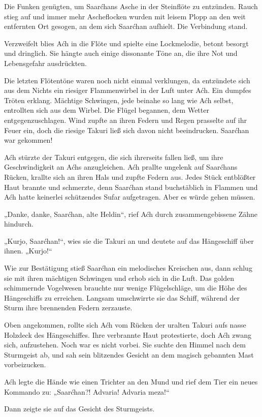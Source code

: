 Die Funken genügten, um Saarćhans Asche in der Steinflöte zu entzünden. Rauch stieg auf und immer mehr Ascheflocken wurden mit leisem Plopp an den weit entfernten Ort gesogen, an dem sich Saarćhan aufhielt. Die Verbindung stand.

Verzweifelt blies Aćh in die Flöte und spielte eine Lockmelodie, betont besorgt und dringlich. Sie hängte auch einige dissonante Töne an, die ihre Not und Lebensgefahr ausdrückten.

Die letzten Flötentöne waren noch nicht einmal verklungen, da entzündete sich aus dem Nichts ein riesiger Flammenwirbel in der Luft unter Aćh. Ein dumpfes Tröten erklang. Mächtige Schwingen, jede beinahe so lang wie Aćh selbst, entrollten sich aus dem Wirbel. Die Flügel begannen, dem Wetter entgegenzuschlagen. Wind zupfte an ihren Federn und Regen prasselte auf ihr Feuer ein, doch die riesige Takuri ließ sich davon nicht beeindrucken. Saarćhan war gekommen!

Aćh stürzte der Takuri entgegen, die sich ihrerseits fallen ließ, um ihre Geschwindigkeit an Aćhs anzugleichen. Aćh prallte ungelenk auf Saarćhans Rücken, krallte sich an ihren Hals und zupfte Federn aus. Jedes Stück entblößter Haut brannte und schmerzte, denn Saarćhan stand buchstäblich in Flammen und Aćh hatte keinerlei schützendes Sufar aufgetragen. Aber es würde gehen müssen.

„Danke, danke, Saarćhan, alte Heldin“, rief Aćh durch zusammengebissene Zähne hindurch.

„Kurjo, Saarćhan!“, wies sie die Takuri an und deutete auf das Hängeschiff über ihnen. „Kurjo!“

Wie zur Bestätigung stieß Saarćhan ein melodisches Kreischen aus, dann schlug sie mit ihren mächtigen Schwingen und erhob sich in die Luft. Das golden schimmernde Vogelwesen brauchte nur wenige Flügelschläge, um die Höhe des Hängeschiffs zu erreichen. Langsam umschwirrte sie das Schiff, während der Sturm ihre brennenden Federn zerzauste.

Oben angekommen, rollte sich Aćh vom Rücken der uralten Takuri aufs nasse Holzdeck des Hängeschiffes. Ihre verbrannte Haut protestierte, doch Aćh zwang sich, aufzustehen. Noch war es nicht vorbei. Sie suchte den Himmel nach dem Sturmgeist ab, und sah sein blitzendes Gesicht an dem magisch gebannten Mast vorbeizucken.

Aćh legte die Hände wie einen Trichter an den Mund und rief dem Tier ein neues Kommando zu: „Saarćhan?! Advaria! Advaria meza!“

Dann zeigte sie auf das Gesicht des Sturmgeists.

